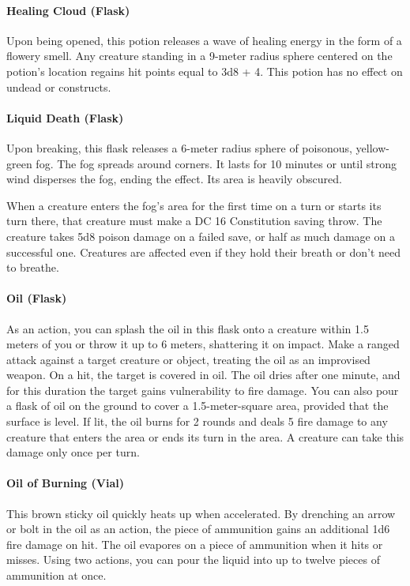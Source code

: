 \paragraph{Healing Cloud (Flask)} %
    Upon being opened, this potion releases a wave of healing energy in the form of a flowery smell.
    Any creature standing in a 9-meter radius sphere centered on the potion's location regains hit points equal to 3d8 + 4.
    This potion has no effect on undead or constructs.
\paragraph{Liquid Death (Flask)} %
    Upon breaking, this flask releases a 6-meter radius sphere of poisonous, yellow-green fog.
    The fog spreads around corners.
    It lasts for 10 minutes or until strong wind disperses the fog, ending the effect.
    Its area is heavily obscured.

    When a creature enters the fog's area for the first time on a turn or starts its turn there, that creature must make a DC 16 Constitution saving throw.
    The creature takes 5d8 poison damage on a failed save, or half as much damage on a successful one.
    Creatures are affected even if they hold their breath or don't need to breathe.

\paragraph{Oil (Flask)}
    As an action, you can splash the oil in this flask onto a creature within 1.5 meters of you or throw it up to 6 meters, shattering it on impact.
    Make a ranged attack against a target creature or object, treating the oil as an improvised weapon.
    On a hit, the target is covered in oil.
    The oil dries after one minute, and for this duration the target gains vulnerability to fire damage.
    You can also pour a flask of oil on the ground to cover a 1.5-meter-square area, provided that the surface is level.
    If lit, the oil burns for 2 rounds and deals 5 fire damage to any creature that enters the area or ends its turn in the area.
    A creature can take this damage only once per turn.
\paragraph{Oil of Burning (Vial)} %
    This brown sticky oil quickly heats up when accelerated.
    By drenching an arrow or bolt in the oil as an action, the piece of ammunition gains an additional 1d6 fire damage on hit.
    The oil evapores on a piece of ammunition when it hits or misses.
    Using two actions, you can pour the liquid into up to twelve pieces of ammunition at once.
